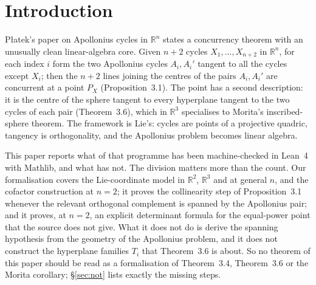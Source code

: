 \documentclass[11pt]{article}
\theoremstyle{definition}
\theoremstyle{remark}
\newcommand{\RR}{\mathbb{R}}
\begin{document}
\section{Introduction}

Płatek's paper on Apollonius cycles in $\RR^n$ \cite{platek} states a concurrency theorem with an
unusually clean linear-algebra core. Given $n+2$ cycles $X_1,\dots,X_{n+2}$ in $\RR^n$, for each
index $i$ form the two Apollonius cycles $A_i,A_i'$ tangent to all the cycles except $X_i$; then the
$n+2$ lines joining the centres of the pairs $A_i,A_i'$ are concurrent at a point $P_X$
(Proposition~3.1). The point has a second description: it is the centre of the sphere tangent to
every hyperplane tangent to the two cycles of each pair (Theorem~3.6), which in $\RR^3$ specialises
to Morita's inscribed-sphere theorem. The framework is Lie's: cycles are points of a projective
quadric, tangency is orthogonality, and the Apollonius problem becomes linear algebra.

This paper reports what of that programme has been machine-checked in Lean~4 with Mathlib, and what
has not. The division matters more than the count. Our formalisation covers the Lie-coordinate model in $\RR^2$, $\RR^3$ and at general $n$, and the
cofactor construction at $n=2$; it proves the
collinearity step of Proposition~3.1 whenever the relevant orthogonal complement is spanned by the
Apollonius pair; and it proves, at $n=2$, an explicit determinant formula for the equal-power point that the source
does not give. What it does not do is derive the spanning hypothesis from the geometry of the
Apollonius problem, and it does not construct the hyperplane families $T_i$ that Theorem~3.6 is
about. So no theorem of this paper should be read as a formalisation of Theorem~3.4, Theorem~3.6 or
the Morita corollary; \S\ref{sec:not} lists exactly the missing steps.
\end{document}
